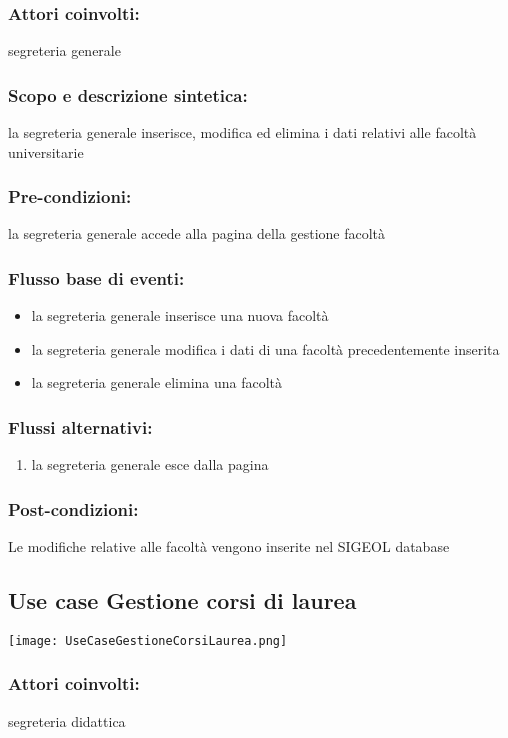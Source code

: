 \documentclass[11pt,a4paper]{article}
\begin{document}
\subsubsection*{Attori coinvolti:}
segreteria generale
\subsubsection*{Scopo e descrizione sintetica:}
la segreteria generale inserisce, modifica ed elimina i dati relativi alle facoltà universitarie
\subsubsection*{Pre-condizioni:}
la segreteria generale accede alla pagina della gestione facoltà
\subsubsection*{Flusso base di eventi:}
\begin{itemize}
 \item la segreteria generale inserisce una nuova facoltà
 \item la segreteria generale modifica i dati di una facoltà precedentemente inserita
 \item la segreteria generale elimina una facoltà
\end{itemize}
\subsubsection*{Flussi alternativi:}
\begin{enumerate} 
 \item la segreteria generale esce dalla pagina
\end{enumerate}
\subsubsection*{Post-condizioni:}
Le modifiche relative alle facoltà vengono inserite nel SIGEOL database

\subsection{Use case Gestione corsi di laurea}
\begin{center} 
 \texttt{[image: UseCaseGestioneCorsiLaurea.png]}
\end{center}
\subsubsection*{Attori coinvolti:}
segreteria didattica
\end{document}
